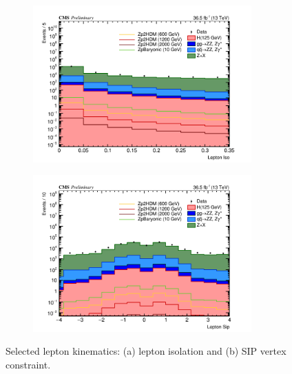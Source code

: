 \begin{figure}[tbh]
\begin{subfigure}{0.50\textwidth}
\centering
\includegraphics[width=3.3in]{figures/hist_hIsoLep_3.png}
\caption{}
\end{subfigure}
\begin{subfigure}{0.50\textwidth}
\centering
\includegraphics[width=3.3in]{figures/hist_hSipLep_3.png}
\caption{}
\end{subfigure}
\caption{Selected lepton kinematics: (a) lepton isolation and (b) SIP vertex constraint.}
\label{fig:lepkin2}
\end{figure}

 

